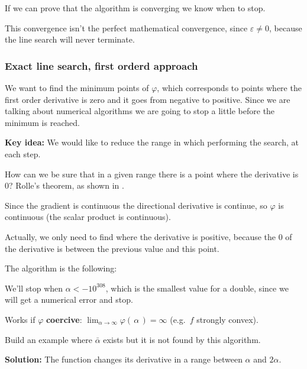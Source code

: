 \documentclass[ComputationalMathematics.tex]{subfiles}
\begin{document}
If we can prove that the algorithm is converging we know when to stop.

This convergence isn't the perfect mathematical convergence, since $\varepsilon \ne 0$, because the line search will never terminate.


\subsubsection{Exact line search, first orderd approach}
We want to find the minimum points of $\varphi$, which corresponds to points where the first order derivative is zero and it goes from negative to positive. Since we are talking about numerical algorithms we are going to stop a little before the minimum is reached.

\textbf{Key idea:} We would like to reduce the range in which performing the search, at each step.

How can we be sure that in a given range there is a point where the derivative is $0$? Rolle's theorem, as shown in .


Since the gradient is continuous the directional derivative is continue, so $\varphi$ is continuous (the scalar product is continuous).

Actually, we only need to find where the derivative is positive, because the $0$ of the derivative is between the previous value and this point.

The algorithm is the following:


We'll stop when $\alpha < -{10}^{308}$, which is the smallest value for a double, since we will get a numerical error and stop.

Works if $\varphi$ \textbf{coercive}:
       $\lim_{\alpha \to \infty} \varphi( \, \alpha \, ) = \infty$
       (e.g.~$f$ strongly convex).

\begin{exe}
Build an example where $\bar{\alpha}$ exists but it is not found by this algorithm.
\end{exe}
\textbf{Solution:} The function changes its derivative in a range between $\alpha$ and $2 \alpha$.
\end{document}
